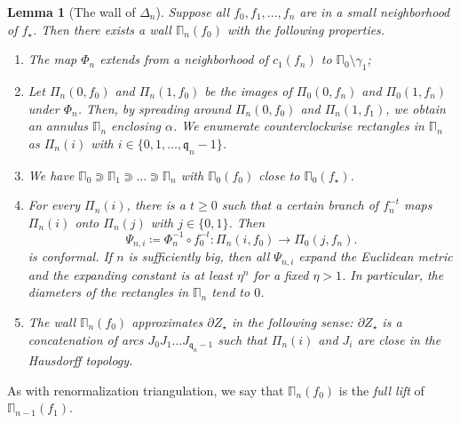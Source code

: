 \documentclass[]{amsart}
\newcommand{\bDelta}{{\mathbb{\Delta}}}
\newcommand{\bPi}{{\mathbb{\Pi}}}
\newcommand{\str}{{\star}}
\renewcommand{\qq}{\mathfrak{q}}
\newtheorem{lem}[thm]{Lemma}
\theoremstyle{remark}
\numberwithin{equation}{section}
\theoremstyle{definition}
\begin{document}
\begin{lem}[The wall of $\bDelta_n$]
\label{lem:SiegWall}
Suppose all $f_0,f_1,\dots, f_n$ are in a small neighborhood of $f_\str$. Then there exists a wall $\bPi_n(f_0)$ with the following properties.
\begin{enumerate}
\item The map $\Phi_n$ extends from a neighborhood of $c_1(f_n)$ to $\bPi_0\setminus \gamma_1$;
\label{Claim:Axil:on expansion:1}
\item Let $\Pi_n(0,f_0)$ and $\Pi_n(1,f_0)$ be the images of $\Pi_0(0,f_n)$ and $\Pi_0(1,f_n)$ under $\Phi_n$. Then, by spreading around $\Pi_n(0,f_0)$ and $\Pi_n(1,f_1)$, we obtain an annulus $\bPi_n$ enclosing $\alpha$. We enumerate counterclockwise rectangles in $\bPi_n$ as $\Pi_n(i)$ with $i\in \{0,1,\dots, \qq_n-1\}$. \label{Claim:Axil:on expansion:2}
\item We have $\bPi_0\Supset \bPi_1\Supset \dots \Supset \bPi{}_n$ with $\bPi_0(f_0)$ close to $\bPi_0(f_\str)$.\label{Claim:Axil:on expansion:3}
\item For every $\Pi_n(i)$, there is a $t\ge0$ such that a certain branch of $f^{-t}_n$ maps $\Pi_n(i)$ onto $\Pi_n(j)$ with $j\in\{0,1\}$. Then 
\begin{equation}
\label{eq:PsiDefn:2}
 \Psi_{n,i} \coloneqq \Phi_{n}^{-1}\circ f_0^{-t} \colon \Pi_n(i, f_0)\to \Pi_0(j,f_n). 
\end{equation}
is conformal. If $n$ is sufficiently big, then all $\Psi_{n,i}$ expand the Euclidean metric and the expanding constant is at least $\eta^n$ for a fixed $\eta>1$. In particular, the diameters of the rectangles in $\bPi_n$ tend to $0$. 
\label{Claim:Axil:on expansion:4}
\item The wall $\bPi_n(f_0)$ approximates $\partial Z_\str$ in the following sense: $\partial Z_\str$ is a concatenation of arcs $J_0J_1\dots J_{\qq_n-1}$ such that $\Pi_n(i)$ and $J_i$ are close in the Hausdorff topology.
\label{Claim:Axil:on expansion:5}
\end{enumerate}
\end{lem}
\noindent As with renormalization triangulation, we say that  $\bPi_n(f_0)$ is the \emph{full lift} of $\bPi_{n-1}(f_1)$.  
\end{document}
